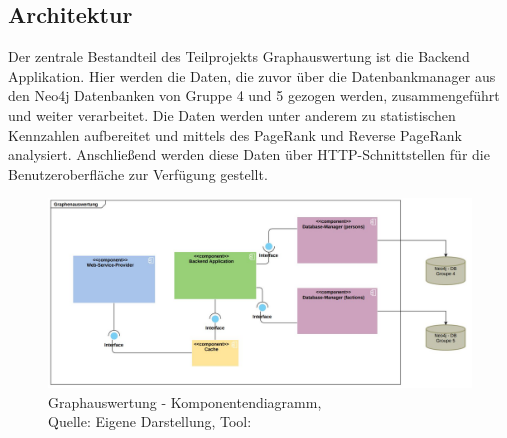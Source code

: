 \subsection{Architektur}
Der zentrale Bestandteil des Teilprojekts Graphauswertung ist die Backend Applikation. Hier werden die Daten, die zuvor über die Datenbankmanager aus den Neo4j Datenbanken von Gruppe 4 und 5 gezogen werden, zusammengeführt und weiter verarbeitet. Die Daten werden unter anderem zu statistischen Kennzahlen aufbereitet und mittels des PageRank und Reverse PageRank analysiert. Anschließend werden diese Daten über HTTP-Schnittstellen für die Benutzeroberfläche zur Verfügung gestellt.
\begin{figure}[H]
	\centering
	\includegraphics[width=450px, keepaspectratio]{images/07-Graphauswertung/graphenauswertung_architektur}
	\caption{Graphauswertung - Komponentendiagramm,\\Quelle: Eigene Darstellung, Tool: \cite{visual_paradigm}}
\end{figure}
